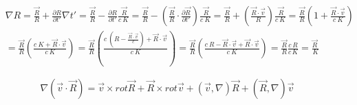 \documentclass[11pt]{article}
\begin{document}
\[\begin{align}
& \nabla R=\frac{\overrightarrow{R}}{R}+\frac{\partial R}{\partial t'}\nabla t'=\frac{\overrightarrow{R}}{R}-\frac{\partial R}{\partial t'}\frac{\ \overrightarrow{R}}{c\ K}=\frac{\overrightarrow{R}}{R}-\left( \frac{\overrightarrow{R}}{R}\cdot \frac{\partial \overrightarrow{R}}{\partial t'} \right)\frac{\ \overrightarrow{R}}{c\ K}=\frac{\overrightarrow{R}}{R}+\left( \frac{\overrightarrow{R}\cdot \overrightarrow{v}}{R} \right)\frac{\ \overrightarrow{R}}{c\ K}=\frac{\overrightarrow{R}}{R}\left( 1+\frac{\overrightarrow{R}\cdot \overrightarrow{v}}{c\ K} \right) \\ 
& =\frac{\overrightarrow{R}}{R}\left( \frac{c\ K+\overrightarrow{R}\cdot \overrightarrow{v}}{c\ K} \right)=\frac{\overrightarrow{R}}{R}\left( \frac{c\ \left( R-\frac{\overrightarrow{R}\cdot \overrightarrow{v}}{c} \right)+\overrightarrow{R}\cdot \overrightarrow{v}}{c\ K} \right)=\frac{\overrightarrow{R}}{R}\left( \frac{c\ R-\overrightarrow{R}\cdot \overrightarrow{v}+\overrightarrow{R}\cdot \overrightarrow{v}}{c\ K} \right)=\frac{\overrightarrow{R}}{R}\frac{c\,R}{c\,K}=\frac{\overrightarrow{R}\ }{K}
\end{align}\]

\[\nabla \left( \overrightarrow{v}\cdot \overrightarrow{R} \right)=\overrightarrow{v}\times rot\overrightarrow{R}+\overrightarrow{R}\times rot\overrightarrow{v}+\left( \overrightarrow{v},\nabla  \right)\overrightarrow{R}+\left( \overrightarrow{R},\nabla  \right)\overrightarrow{v}\]
\end{document}
